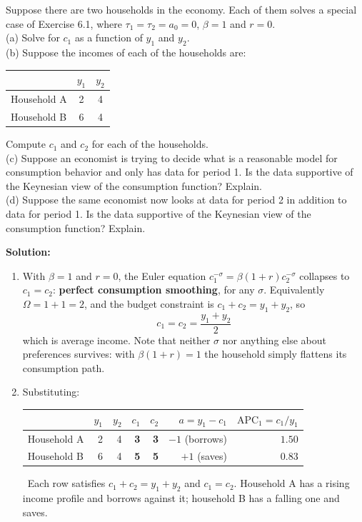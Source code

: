 \documentclass[12pt, letterpaper]{article}
\begin{document}
\begin{tcolorbox}[evenbox,title={Problem 6.4 \quad Consumption and Income}]
\begin{tcolorbox}[questionbox]
Suppose there are two households in the economy. Each of them solves a special case of
Exercise 6.1, where $\tau_1=\tau_2=a_0=0$, $\beta=1$ and $r=0$.\\[3pt]
(a) Solve for $c_1$ as a function of $y_1$ and $y_2$.\\[3pt]
(b) Suppose the incomes of each of the households are:
\begin{center}
\begin{tabular}{@{}lcc@{}}
\toprule
 & $y_1$ & $y_2$ \\
\midrule
Household A & 2 & 4 \\
Household B & 6 & 4 \\
\bottomrule
\end{tabular}
\end{center}
Compute $c_1$ and $c_2$ for each of the households.\\[3pt]
(c) Suppose an economist is trying to decide what is a reasonable model for consumption
behavior and only has data for period 1. Is the data supportive of the Keynesian view of the
consumption function? Explain.\\[3pt]
(d) Suppose the same economist now looks at data for period 2 in addition to data for period
1. Is the data supportive of the Keynesian view of the consumption function? Explain.
\end{tcolorbox}

\textbf{Solution:}
\begin{enumerate}

\item With $\beta=1$ and $r=0$, the Euler equation $c_1^{-\sigma}=\beta(1+r)c_2^{-\sigma}$
collapses to $c_1=c_2$: \textbf{perfect consumption smoothing}, for any $\sigma$.
Equivalently $\Omega=1+1=2$, and the budget constraint is $c_1+c_2=y_1+y_2$, so
\[
\boxed{\;c_1=c_2=\frac{y_1+y_2}{2}\;}
\]
which is average income. Note that neither $\sigma$ nor anything else about preferences
survives: with $\beta(1+r)=1$ the household simply flattens its consumption path.

\item Substituting:
\begin{center}
\begin{tabular}{@{}lrrrrrr@{}}
\toprule
 & $y_1$ & $y_2$ & $c_1$ & $c_2$ & $a=y_1-c_1$ & $\mathrm{APC}_1=c_1/y_1$ \\
\midrule
Household A & 2 & 4 & \textbf{3} & \textbf{3} & $-1$ (borrows) & $1.50$ \\
Household B & 6 & 4 & \textbf{5} & \textbf{5} & $+1$ (saves)   & $0.83$ \\
\bottomrule
\end{tabular}
\end{center}
\checkmark\ Each row satisfies $c_1+c_2=y_1+y_2$ and $c_1=c_2$. Household A has a rising
income profile and borrows against it; household B has a falling one and saves.


\end{enumerate}
\end{tcolorbox}
\end{document}

